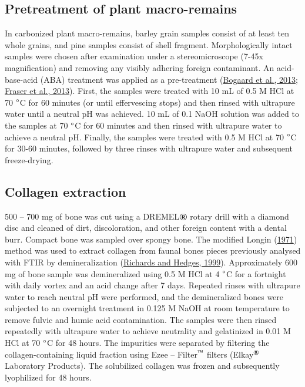 \documentclass[preprint, 3p, authoryear]{elsarticle} %
\begin{document}
\hypertarget{pretreatment-of-plant-macro-remains}{%
\subsection{Pretreatment of plant macro-remains}\label{pretreatment-of-plant-macro-remains}}

In carbonized plant macro-remains, barley grain samples consist of at least ten whole grains, and pine samples consist of shell fragment. Morphologically intact samples were chosen after examination under a stereomicroscope (7-45x magnification) and removing any visibly adhering foreign contaminant. An acid-base-acid (ABA) treatment was applied as a pre-treatment (\protect\hyperlink{ref-bogaard_etal13}{Bogaard et al., 2013}; \protect\hyperlink{ref-fraser_etal13a}{Fraser et al., 2013}). First, the samples were treated with 10 mL of 0.5 M HCl at 70 \(\text{\textdegree}\)C for 60 minutes (or until effervescing stops) and then rinsed with ultrapure water until a neutral pH was achieved. 10 mL of 0.1 NaOH solution was added to the samples at 70 \(\text{\textdegree}\)C for 60 minutes and then rinsed with ultrapure water to achieve a neutral pH. Finally, the samples were treated with 0.5 M HCl at 70 \(\text{\textdegree}\)C for 30-60 minutes, followed by three rinses with ultrapure water and subsequent freeze-drying.

\hypertarget{collagen-extraction}{%
\subsection{Collagen extraction}\label{collagen-extraction}}

500 -- 700 mg of bone was cut using a DREMEL\(\text{\textregistered}\) rotary drill with a diamond disc and cleaned of dirt, discoloration, and other foreign content with a dental burr. Compact bone was sampled over spongy bone. The modified Longin (\protect\hyperlink{ref-longin71}{1971}) method was used to extract collagen from faunal bones pieces previously analysed with FTIR by demineralization (\protect\hyperlink{ref-richards_hedges99}{Richards and Hedges, 1999}). Approximately 600 mg of bone sample was demineralized using 0.5 M HCl at 4 \(\text{\textdegree}\)C for a fortnight with daily vortex and an acid change after 7 days. Repeated rinses with ultrapure water to reach neutral pH were performed, and the demineralized bones were subjected to an overnight treatment in 0.125 M NaOH at room temperature to remove fulvic and humic acid contamination. The samples were then rinsed repeatedly with ultrapure water to achieve neutrality and gelatinized in 0.01 M HCl at 70 \(\text{\textdegree}\)C for 48 hours. The impurities were separated by filtering the collagen-containing liquid fraction using Ezee -- Filter\(^\text{\texttrademark}\) filters (Elkay\(^\text{\textregistered}\) Laboratory Products). The solubilized collagen was frozen and subsequently lyophilized for 48 hours.
\end{document}
